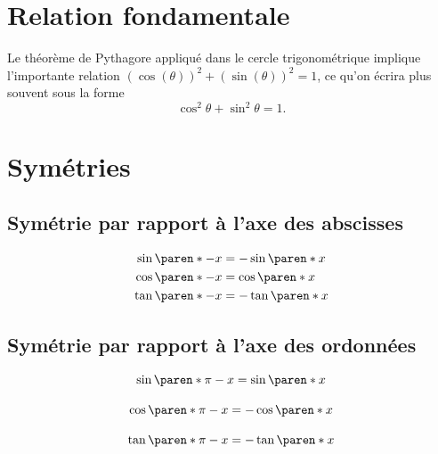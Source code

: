 \section{Relation fondamentale}
\begin{frame}
  Le théorème de Pythagore appliqué dans le cercle trigonométrique implique l'importante relation $(\cos(\theta))^2 + (\sin(\theta))^2 = 1$, ce qu'on écrira plus souvent sous la forme
  \begin{equation*}
    \cos^2\theta + \sin^2 \theta  = 1.
  \end{equation*}
\end{frame}

\section{Symétries}
\subsection{Symétrie par rapport à l'axe des abscisses}
\begin{frame}
\begin{minipage}{0.5\linewidth}
\centering
\scalebox{0.75}{}
\end{minipage}
\begin{minipage}{0.45\linewidth}
\centering

\begin{align*}
\sin\paren*{ -x}&=-\sin\paren*{ x} \\
\cos\paren*{ -x}&=\cos\paren*{ x} \\ 
\tan\paren*{ -x}&=-\tan\paren*{ x}
\end{align*}
\end{minipage}
\end{frame}
\subsection{Symétrie par rapport à l'axe des ordonnées}
\begin{frame}
\begin{minipage}{0.5\linewidth}
\centering
\scalebox{0.75}{}
\end{minipage}
\begin{minipage}{0.45\linewidth}
\centering
\[\begin{array}{c}
\sin\paren*{ \pi -x} =\sin\paren*{ x} \\
\\
\cos\paren*{ \pi -x} =-\cos\paren*{ x} \\
\\
\tan\paren*{ \pi -x} =-\tan\paren*{ x}
\end{array}\]
\end{minipage}
\end{frame}
